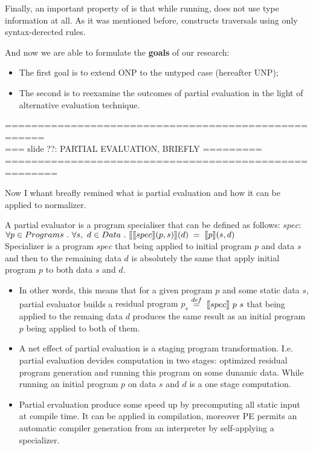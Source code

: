 \documentclass[a4paper, 10pt]{article} %
\newcommand{\bi}{\begin{itemize}}
\newcommand{\ei}{\end{itemize}}
\newcommand{\ii}{\item}
\newcommand{\green}[1]{{\color{blue!20!black!30!green}#1}}
\newcommand{\blue}[1]{{\color{blue}#1}}
\newcommand{\lam}[1]{{\color{brown}\textit{\boldmath{#1}}}}
\newcommand{\lsem}{\mbox{$\lbrack\hspace{-0.3ex}\lbrack$}}
\newcommand{\rsem}{\mbox{$\rbrack\hspace{-0.3ex}\rbrack$}}
\begin{document}
Finally, an important property of \lam{ONP} is that while running, \lam{ONP} does not use type information at all.
As it was mentioned before, \lam{ONP} constructs traversals using only \blue{syntax-derected rules}. 

And now we are able to formulate the \textbf{goals} of our research:

\bi
\ii The first goal is to extend \green{ONP} to the untyped case (hereafter \green{UNP});
\ii The second is to reexamine the outcomes of partial evaluation in the light of 
alternative evaluation technique.
\ei


====================================================\\
=== slide ??: PARTIAL EVALUATION, BRIEFLY =========\\
======================================================

Now I whant breafly remined what is partial evaluation and how it can be applied to normalizer.

A partial evaluator is a \blue{program specialiser} that can be defined as follows: $spec$:\\
$\forall p \in Programs\ .\ \forall s,\ d \in Data\ .\ \lsem \lsem spec\rsem (p, s)\rsem (d)\;=\; \lsem p \rsem (s, d)$\\
Specializer is a program $spec$ that being applied to initial program $p$ and data $s$ and then to the remaining data $d$ is absolutely the same that apply initial program $p$ to both data $s$ and $d$.

\bi
\ii In other words, this means that for a given program $p$ and some static data $s$, partial evaluator builds a \blue{residual program $p_s$}$\;\stackrel{def}{=}\;\lsem spec \rsem \ p\ s$ that being applied to the remaing data $d$ produces the same result as an initial program $p$ being applied to both of them.

\ii A net effect of partial evaluation is a \blue{staging program transformation}. I.e. partial evaluation devides computation in two stages:
  optimized residual program generation and running this program on some dunamic data.
  While running an initial program $p$ on data $s$ and $d$ is a one stage computation.

\ii Partial ervaluation produce some speed up by \green{precomputing} all static input at compile time.
  It can be applied in \blue{compilation}, moreover PE permits an \blue{automatic compiler generation} from an interpreter by self-applying a specializer.
\ei
\ \\
\end{document}
